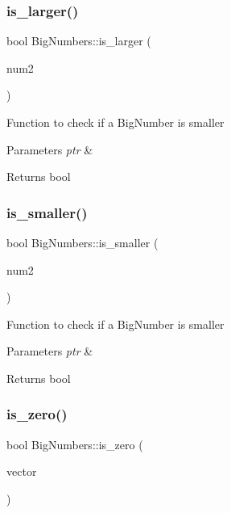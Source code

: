 \subsubsection{\texorpdfstring{is\+\_\+larger()}{is\_larger()}}
{\footnotesize\ttfamily bool Big\+Numbers\+::is\+\_\+larger (\begin{DoxyParamCaption}\item[{\mbox{\hyperlink{classBigNumbers}{Big\+Numbers}} $\ast$}]{num2 }\end{DoxyParamCaption})}

Function to check if a Big\+Number is smaller 
\begin{DoxyParams}{Parameters}
{\em ptr} & \\
\hline
\end{DoxyParams}
\begin{DoxyReturn}{Returns}
bool 
\end{DoxyReturn}
\mbox{\label{classBigNumbers_a507cc9d1c3a81be8bbd26b82147bef08}} 
\subsubsection{\texorpdfstring{is\+\_\+smaller()}{is\_smaller()}}
{\footnotesize\ttfamily bool Big\+Numbers\+::is\+\_\+smaller (\begin{DoxyParamCaption}\item[{\mbox{\hyperlink{classBigNumbers}{Big\+Numbers}} $\ast$}]{num2 }\end{DoxyParamCaption})}

Function to check if a Big\+Number is smaller 
\begin{DoxyParams}{Parameters}
{\em ptr} & \\
\hline
\end{DoxyParams}
\begin{DoxyReturn}{Returns}
bool 
\end{DoxyReturn}
\mbox{\label{classBigNumbers_aadaa69c23de5d36bc361e9c5fcab0ce7}} 
\subsubsection{\texorpdfstring{is\+\_\+zero()}{is\_zero()}}
{\footnotesize\ttfamily bool Big\+Numbers\+::is\+\_\+zero (\begin{DoxyParamCaption}\item[{vector$<$ int $>$}]{vector }\end{DoxyParamCaption})}

